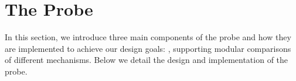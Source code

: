 \section{The \sys{} Probe}
In this section, we introduce three main components of the \sys{} probe and how they are implemented to achieve our design goals: , supporting modular comparisons of different mechanisms.
Below we detail the design and implementation of the probe.


